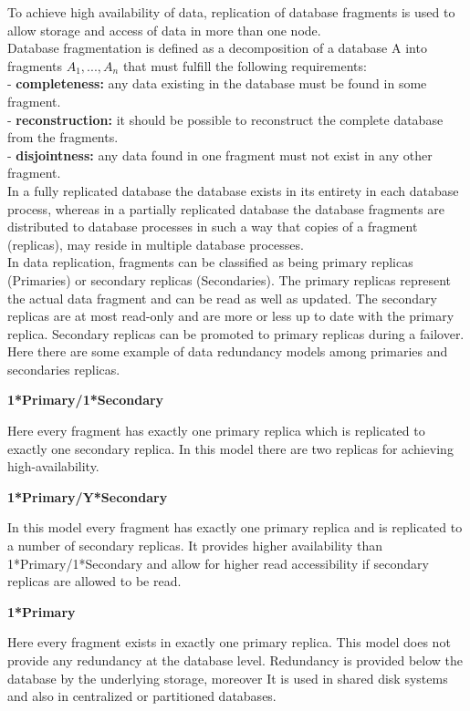 \documentclass[english]{tktltiki2}
\theoremstyle{definition}
\theoremstyle{remark}
\begin{document}
To achieve high availability of data, replication of database fragments is used to allow storage and access of data in more than one node.\\ 
Database fragmentation is defined as a decomposition of a database A into fragments $A_1, ..., A_n$ that must fulfill the following requirements:\\
 - \textbf{completeness:} any data existing in the database must be found in some
fragment.\\
 - \textbf{reconstruction:} it should be possible to reconstruct the complete database from the fragments.\\
 - \textbf{disjointness:} any data found in one fragment must not exist in any other
fragment.\\
In a fully replicated database the database exists in its entirety in each database process, whereas in a partially replicated database the database fragments are distributed to database processes in such a way that copies of a fragment (replicas), may reside in multiple database processes.\\
In data replication, fragments can be classified as being primary replicas (Primaries) or secondary replicas (Secondaries). The primary replicas represent the actual data fragment and can be read as well as updated. The secondary replicas are at most read-only and are more or less up to date with the primary replica. Secondary replicas can be promoted to primary replicas during a failover.\\
Here there are some example of data redundancy models among primaries and secondaries replicas.\\

\begin{flushleft}
\textbf{1*Primary/1*Secondary}
\end{flushleft}
Here every fragment has exactly one primary replica which is replicated to exactly one secondary replica. In this model there are two replicas for achieving high-availability.

\begin{flushleft}
\textbf{1*Primary/Y*Secondary}
\end{flushleft}
In this model every fragment has exactly one primary replica and is replicated to a number of secondary replicas. It provides higher availability than 1*Primary/1*Secondary and allow for higher read accessibility if secondary replicas are allowed to be read.

\begin{flushleft}
\textbf{1*Primary}
\end{flushleft}
Here every fragment exists in exactly one primary replica. This model does not provide any redundancy at the database level. Redundancy is provided below the database by the underlying storage, moreover It is used in shared disk systems and also in centralized or partitioned databases.
\end{document}
